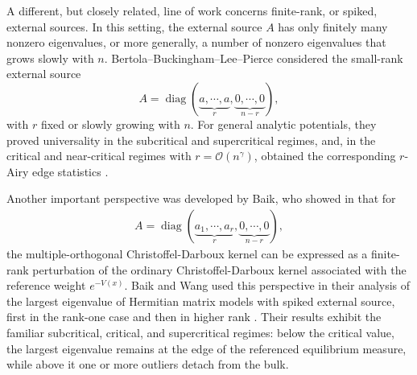 \documentclass[a4paper,10pt,leqno]{amsart}
\numberwithin{equation}{section}
\theoremstyle{remark}
\newcommand{\blue}[1]{{\color{blue} #1}}
\newcommand{\magenta}[1]{{\color{magenta} #1}}
\begin{document}
A different, but closely related, line of work concerns finite-rank, or
spiked, external sources.  In this setting, the external source $A$ has only
finitely many nonzero eigenvalues, or more generally, a number of nonzero
eigenvalues that grows slowly with $n$.  Bertola--Buckingham--Lee--Pierce
considered the small-rank external source
\[
    A=\operatorname{diag}(\underbrace{a,\cdots,a}_{r},\underbrace{0,\cdots,0}_{n-r}),
\]
with $r$ fixed or slowly growing with $n$.  For general analytic potentials,
they proved universality in the subcritical and supercritical regimes, and, in
the critical and near-critical regimes with $r=\mathcal O(n^\gamma)$, obtained
the corresponding $r$-Airy edge statistics \cite{BBLP12,BBLP13}.

Another important perspective was developed by Baik, who showed in
\cite{Bai09} that for
\begin{align} \label{external source A}
    A=\operatorname{diag}(\underbrace{a_1,\cdots,a_r}_{r},\underbrace{0,\cdots,0}_{n-r}),
\end{align}
the multiple-orthogonal Christoffel-Darboux kernel can be expressed as a finite-rank perturbation of the ordinary Christoffel-Darboux kernel associated with the reference weight $e^{-V(x)}$.
Baik and Wang used this perspective in their analysis of the largest eigenvalue of Hermitian matrix models with spiked external source, first in the rank-one case and then in higher rank \cite{BaikWang1, BaikWang2}.
Their results exhibit the familiar subcritical, critical, and supercritical regimes: below the critical value, the largest eigenvalue remains at the edge of the referenced equilibrium measure, while above it one or more outliers detach from the bulk.

 
\end{document}

